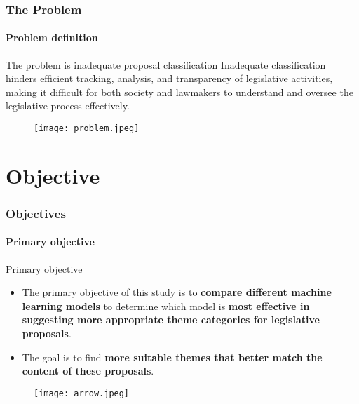 \begin{frame}
	\frametitle{The Problem}
	\framesubtitle{Problem definition}	

	\begin{alertblock}{The problem is inadequate proposal classification}
		Inadequate classification hinders efficient tracking, analysis, and transparency of legislative activities, making it difficult for both society and lawmakers to understand and oversee the legislative process effectively.
	\end{alertblock}	

	\begin{figure}
		\texttt{[image: problem.jpeg]}
	\end{figure}


\end{frame}
\section{Objective}

\begin{frame}
	\frametitle{Objectives}
	\framesubtitle{Primary objective}
	
	\begin{exampleblock}{Primary objective} 
		\begin{itemize}
			\item The primary objective of this study is to \textbf{compare different machine learning models} to determine which model is \textbf{most effective in suggesting more appropriate theme categories for legislative proposals}.
			
			\item The goal is to find \textbf{more suitable themes that better match the content of these proposals}.  
		\end{itemize}
	\end{exampleblock}
	
	\begin{figure}
		\texttt{[image: arrow.jpeg]}
	\end{figure}
	
	
\end{frame}


